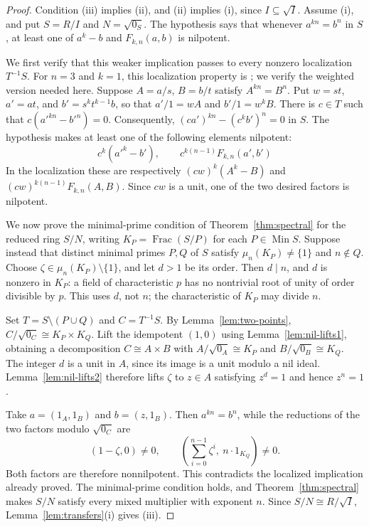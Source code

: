 \documentclass[11pt,a4paper]{amsart}
\theoremstyle{definition}
\theoremstyle{remark}
\DeclareMathOperator{\Min}{Min}
\numberwithin{equation}{section}
\begin{document}
\begin{proof}
Condition (iii) implies (ii), and (ii) implies (i), since $I\subseteq\sqrt I$.
Assume (i), and put $S=R/I$ and $N=\sqrt{0_S}$. The hypothesis says
that whenever $a^{kn}=b^n$ in $S$, at least one of $a^k-b$ and
$F_{k,n}(a,b)$ is nilpotent.

We first verify that this weaker implication passes to every nonzero
localization $T^{-1}S$. For $n=3$ and $k=1$, this localization property
is \cite[Theorem~5.3]{Dr26}; we verify the weighted version needed here.
Suppose $A=a/s$, $B=b/t$ satisfy
$A^{kn}=B^n$. Put $w=st$, $a'=at$, and $b'=s^kt^{k-1}b$, so that
$a'/1=wA$ and $b'/1=w^kB$. There is $c\in T$ such that
$c(a'^{kn}-b'^n)=0$. Consequently,
$(ca')^{kn}-(c^kb')^n=0$ in $S$. The hypothesis makes at least one of
the following elements nilpotent:
\[
 c^k(a'^k-b'),\qquad
 c^{k(n-1)}F_{k,n}(a',b')
\]
In the localization these are respectively
$(cw)^k(A^k-B)$ and $(cw)^{k(n-1)}F_{k,n}(A,B)$.
Since $cw$ is a unit, one of the two desired factors is nilpotent.

We now prove the minimal-prime condition of Theorem~\ref{thm:spectral}
for the reduced ring $S/N$, writing $K_P=\operatorname{Frac}(S/P)$
for each $P\in\Min S$. Suppose instead that distinct minimal
primes $P,Q$ of $S$ satisfy
$\mu_n(K_P)\ne\{1\}$ and $n\notin Q$. Choose
$\zeta\in\mu_n(K_P)\setminus\{1\}$, and let $d>1$ be its order.
Then $d\mid n$, and $d$ is nonzero in $K_P$: a field of
characteristic $p$ has no nontrivial root of unity of order divisible
by $p$. This uses $d$, not $n$; the characteristic of $K_P$ may
divide $n$.

Set $T=S\setminus(P\cup Q)$ and $C=T^{-1}S$. By
Lemma~\ref{lem:two-points},
$C/\sqrt{0_C}\cong K_P\times K_Q$. Lift the idempotent $(1,0)$
using Lemma~\ref{lem:nil-lifts1}, obtaining a decomposition
$C\cong A\times B$ with
$A/\sqrt{0_A}\cong K_P$ and $B/\sqrt{0_B}\cong K_Q$.
The integer $d$ is a unit in $A$, since its image is a unit modulo
a nil ideal. Lemma~\ref{lem:nil-lifts2} therefore lifts $\zeta$ to
$z\in A$ satisfying $z^d=1$ and hence $z^n=1$.

Take $a=(1_A,1_B)$ and $b=(z,1_B)$. Then $a^{kn}=b^n$, while
the reductions of the two factors modulo $\sqrt{0_C}$ are
\[
 (1-\zeta,0)\ne0,
 \qquad
 \left(\sum_{i=0}^{n-1}\zeta^i,\ n\cdot1_{K_Q}\right)\ne0.
\]
Both factors are therefore nonnilpotent. This contradicts the
localized implication already proved. The minimal-prime condition
holds, and Theorem~\ref{thm:spectral} makes $S/N$ satisfy every
mixed multiplier with exponent $n$. Since $S/N\cong R/\sqrt I$,
Lemma~\ref{lem:transfers}(i) gives (iii).
\end{proof}
\end{document}
